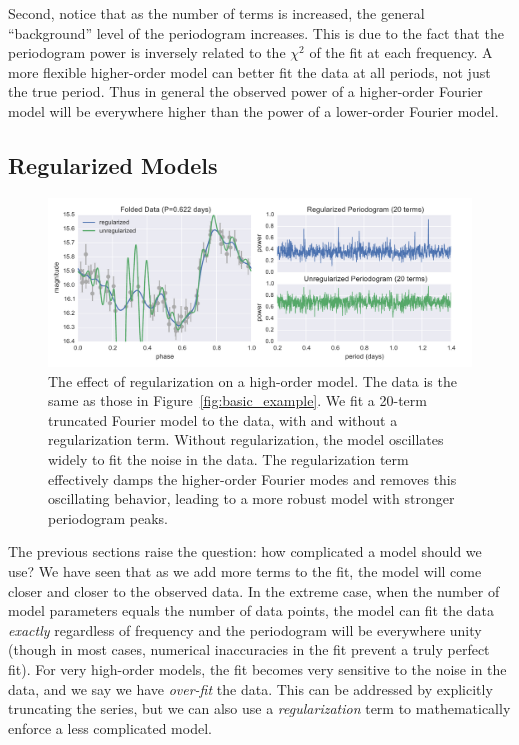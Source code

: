 \documentclass[12pt,preprint]{aastex}
\newcommand{\Fig}[1]{Figure~\ref{fig:#1}}
\newcommand{\fig}[1]{\Fig{#1}}
\newcommand{\figlabel}[1]{\label{fig:#1}}
\begin{document}
Second, notice that as the number of terms is increased, the general ``background'' level of the periodogram increases. This is due to the fact that the periodogram power is inversely related to the $\chi^2$ of the fit at each frequency. A more flexible higher-order model can better fit the data at all periods, not just the true period. Thus in general the observed power of a higher-order Fourier model will be everywhere higher than the power of a lower-order Fourier model.

\subsection{Regularized Models \label{regularization}}


\begin{figure}
  \centering
  \includegraphics[width=\textwidth]{fig04.pdf}
  \caption{
    The effect of regularization on a high-order model. The data is the same as
    those in \fig{basic_example}. We fit a 20-term truncated Fourier model to
    the data, with and without a regularization term. Without regularization,
    the model oscillates widely to fit the noise in the data. The
    regularization term effectively damps the higher-order Fourier modes and
    removes this oscillating behavior, leading to a more robust model with
    stronger periodogram peaks.
  }
  \figlabel{regularized_example}
\end{figure}

The previous sections raise the question: how complicated a model should we use? We have seen that as we add more terms to the fit, the model will come closer and closer to the observed data.  In the extreme case, when the number of model parameters equals the number of data points, the model can fit the data {\it exactly} regardless of frequency and the periodogram will be everywhere unity (though in most cases, numerical inaccuracies in the fit prevent a truly perfect fit). For very high-order models, the fit becomes very sensitive to the noise in the data, and we say we have {\it over-fit} the data. This can be addressed by explicitly truncating the series, but we can also use a {\it regularization} term to mathematically enforce a less complicated model.
\end{document}
